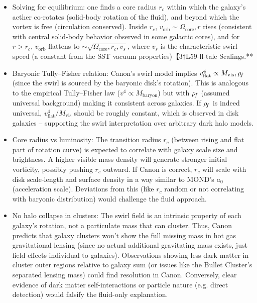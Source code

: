 \documentclass[11pt]{article}
\begin{document}
\begin{itemize}
\item 
Solving for equilibrium: one finds a core radius $r_c$ within which the galaxy’s aether co-rotates (solid-body rotation of the fluid), and beyond which the vortex is free (circulation conserved). Inside $r_c$, $v_{\text{orb}} \sim \Omega_{\text{core}},r$ rises (consistent with central solid-body behavior observed in some galactic cores), and for $r > r_c$, $v_{\text{orb}}$ flattens to $\sim \sqrt{\Omega_{\text{core}},r_c,v_s}$, where $v_s$ is the characteristic swirl speed (a constant from the SST vacuum properties)【3†L59-ll-tale Scalings.**




\item 
Baryonic Tully–Fisher relation: Canon’s swirl model implies $v_{\text{flat}}^4 \propto M_{\text{vis}},\rho_{\!f}$ (since the swirl is sourced by the baryonic disk’s rotation). This is analogous to the empirical Tully–Fisher law ($v^4 \propto M_{\text{baryon}}$) but with $\rho_{\!f}$ (assumed universal background) making it consistent across galaxies. If $\rho_{\!f}$ is indeed universal, $v_{\text{flat}}^4/M_{\text{vis}}$ should be roughly constant, which is observed in disk galaxies – supporting the swirl interpretation over arbitrary dark halo models.




\item 
Core radius vs luminosity: The transition radius $r_c$ (between rising and flat part of rotation curve) is expected to correlate with galaxy scale size and brightness. A higher visible mass density will generate stronger initial vorticity, possibly pushing $r_c$ outward. If Canon is correct, $r_c$ will scale with disk scale-length and surface density in a way similar to MOND’s $a_0$ (acceleration scale). Deviations from this (like $r_c$ random or not correlating with baryonic distribution) would challenge the fluid approach.




\item 
No halo collapse in clusters: The swirl field is an intrinsic property of each galaxy’s rotation, not a particulate mass that can cluster. Thus, Canon predicts that galaxy clusters won’t show the full missing mass in hot gas gravitational lensing (since no actual additional gravitating mass exists, just field effects individual to galaxies). Observations showing less dark matter in cluster outer regions relative to galaxy sum (or issues like the Bullet Cluster’s separated lensing mass) could find resolution in Canon. Conversely, clear evidence of dark matter self-interactions or particle nature (e.g. direct detection) would falsify the fluid-only explanation.




\end{itemize}
\end{document}
